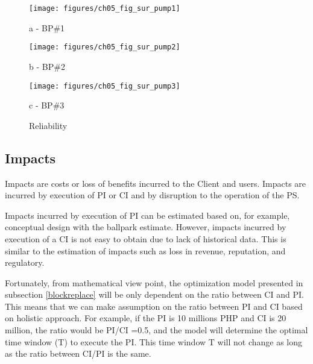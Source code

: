 \begin{figure}[!htb]
	\begin{minipage}[b]{0.5\linewidth}
		\centering
		\texttt{[image: figures/ch05\_fig\_sur\_pump1]}
		\caption*{a - BP\#1}
	\end{minipage}
	\hspace{0.05cm}
	\begin{minipage}[b]{0.5\linewidth}
		\centering
		\texttt{[image: figures/ch05\_fig\_sur\_pump2]}
		\caption*{b - BP\#2}
	\end{minipage}
	\hspace{0.05cm}
	\begin{minipage}[b]{0.5\linewidth}
		\centering
		\texttt{[image: figures/ch05\_fig\_sur\_pump3]}
		\caption*{c - BP\#3}
	\end{minipage}
	\caption{Reliability}
	\label{ch05_fig_reliability}
\end{figure}



\subsection{Impacts}
Impacts are costs or loss of benefits incurred to the Client and users. Impacts are incurred by execution of PI or CI and by disruption to the operation of the PS.

Impacts incurred by execution of PI can be estimated based on, for example, conceptual design with the ballpark estimate. However, impacts incurred by execution of a CI is not easy to obtain due to lack of historical data. This is similar to the estimation of impacts such as loss in revenue, reputation, and regulatory.

Fortunately, from mathematical view point, the optimization model presented in subsection \ref{blockreplace} will be only dependent on the ratio between CI and PI. This means that we can make assumption on the ratio between PI and CI based on holistic approach. For example, if the PI is 10 millions PHP and CI is 20 million, the ratio would be PI/CI =0.5, and the model will determine the optimal time window (T) to execute the PI. This time window T will not change as long as the ratio between CI/PI is the same.


